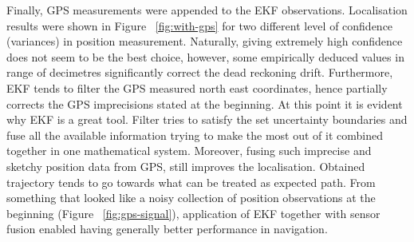  Finally, GPS measurements were appended to the EKF observations. Localisation results were shown in Figure ~\ref{fig:with-gps} for two different level of confidence (variances) in position measurement. Naturally, giving extremely high confidence does not seem to be the best choice, however, some empirically deduced values in range of decimetres significantly correct the dead reckoning drift. Furthermore, EKF tends to filter the GPS measured north east coordinates, hence partially corrects the GPS imprecisions stated at the beginning. At this point it is evident why EKF is a great tool. Filter tries to satisfy the set uncertainty boundaries and fuse all the available information trying to make the most out of it combined together in one mathematical system. Moreover, fusing such imprecise and sketchy position data from GPS, still improves the localisation. Obtained trajectory tends to go towards what can be treated as expected path. From something that looked like a noisy collection of position observations at the beginning (Figure ~\ref{fig:gps-signal}), application of EKF together with sensor fusion enabled having generally better performance in navigation.     
